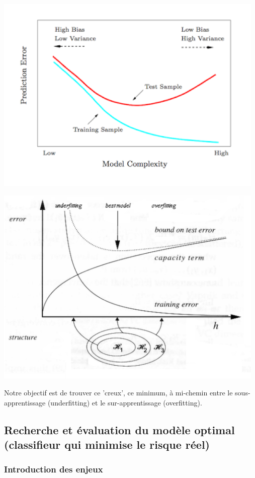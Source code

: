 \documentclass[a4paper]{article}
\theoremstyle{plain}
\begin{document}
\includegraphics[width=13cm]{Overfitting.png}

\includegraphics[width=13cm]{Overfitting2.png}

Notre objectif est de trouver ce 'creux', ce minimum, à mi-chemin entre le sous-apprentissage (underfitting) et le sur-apprentissage (overfitting).\\


\subsection{Recherche et évaluation du modèle optimal (classifieur qui minimise le risque réel)}

\subsubsection{Introduction des enjeux}
\end{document}
